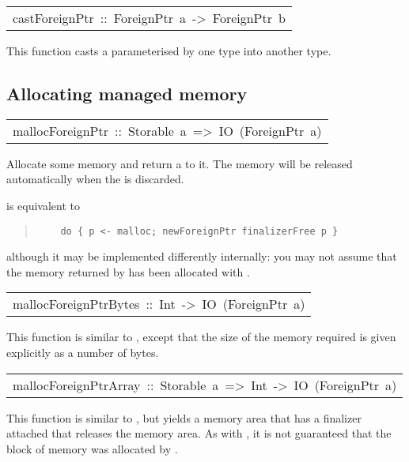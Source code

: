 \begin{haddockdesc}
\item[\begin{tabular}{@{}l}
castForeignPtr\ ::\ ForeignPtr\ a\ ->\ ForeignPtr\ b
\end{tabular}]\haddockbegindoc
This function casts a 
 parameterised by one type into another type.
\par

\end{haddockdesc}
\subsection{Allocating managed memory
}
\begin{haddockdesc}
\item[\begin{tabular}{@{}l}
mallocForeignPtr\ ::\ Storable\ a\ =>\ IO\ (ForeignPtr\ a)
\end{tabular}]\haddockbegindoc
Allocate some memory and return a  to it.  The memory
 will be released automatically when the  is discarded.
\par
{} is equivalent to
\par
\begin{quote}
{\haddockverb\begin{verbatim}
    do { p <- malloc; newForeignPtr finalizerFree p }
\end{verbatim}}
\end{quote}
although it may be implemented differently internally: you may not
 assume that the memory returned by  has been
 allocated with .
\par

\end{haddockdesc}
\begin{haddockdesc}
\item[\begin{tabular}{@{}l}
mallocForeignPtrBytes\ ::\ Int\ ->\ IO\ (ForeignPtr\ a)
\end{tabular}]\haddockbegindoc
This function is similar to , except that the
 size of the memory required is given explicitly as a number of bytes.
\par

\end{haddockdesc}
\begin{haddockdesc}
\item[\begin{tabular}{@{}l}
mallocForeignPtrArray\ ::\ Storable\ a\ =>\ Int\ ->\ IO\ (ForeignPtr\ a)
\end{tabular}]\haddockbegindoc
This function is similar to ,
 but yields a memory area that has a finalizer attached that releases
 the memory area.  As with , it is not guaranteed that
 the block of memory was allocated by .
\par

\end{haddockdesc}
